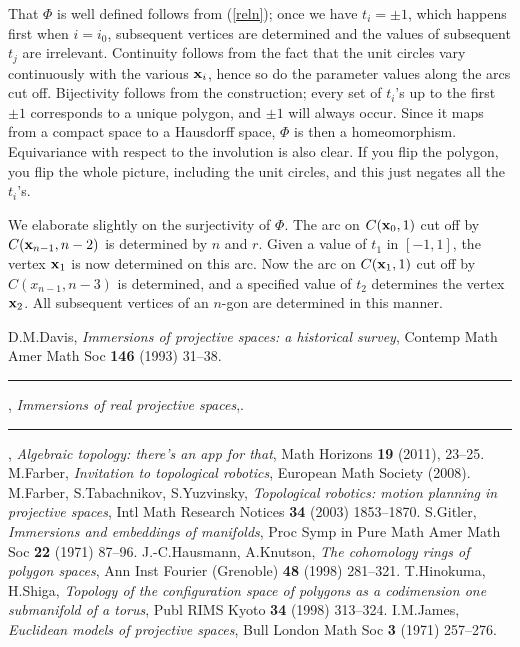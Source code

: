\documentclass[12pt]{amsart}
\numberwithin{equation}{section}
\begin{document}
That $\Phi$ is well defined  follows from (\ref{reln}); once we have $t_i=\pm1$, which happens first when $i=i_0$, subsequent vertices are determined and the values of subsequent
$t_j$ are irrelevant. Continuity follows from the fact that the unit circles vary continuously with the various ${{\bold x}}_i$, hence so do the parameter values along the arcs cut off.
Bijectivity  follows from the construction; every set of $t_i$'s up to the first $\pm1$ corresponds to a unique polygon, and $\pm1$ will always occur. Since it maps from a compact space to a Hausdorff space, $\Phi$ is then a homeomorphism. Equivariance with respect to the involution is also clear. If you flip the polygon, you flip the whole picture, including the unit circles,
and this just negates all the $t_i$'s.

We elaborate slightly on the surjectivity of $\Phi$. The arc on $C({{\bold x}}_0,1)$ cut off by $C({{\bold x}}_{n-1},n-2)$ is determined by $n$ and $r$. Given a value of $t_1$ in $[-1,1]$, the vertex ${{\bold x}}_1$ is now determined on this arc. Now the arc on $C({{\bold x}}_1,1)$ cut off by $C(x_{n-1},n-3)$ is determined, and a specified value of $t_2$ determines the vertex ${{\bold x}}_2$.
All subsequent vertices of an $n$-gon are determined in this manner.

 
\begin{thebibliography}{99}
 D.M.Davis, {\em Immersions of projective spaces: a historical survey}, Contemp Math Amer Math Soc {\bf 146} (1993) 31--38.
 {\rule{.6in}{.6pt}}, {\em Immersions of real projective spaces},.
 {\rule{.6in}{.6pt}}, {\em Algebraic topology: there's an app for that}, Math Horizons {\bf 19} (2011), 23--25.
 M.Farber, {\em Invitation to topological robotics}, European Math Society (2008).
 M.Farber, S.Tabachnikov, S.Yuzvinsky, {\em Topological robotics: motion planning in projective spaces}, Intl Math Research Notices {\bf 34} (2003) 1853--1870.
 S.Gitler, {\em Immersions and embeddings of manifolds}, Proc Symp in Pure Math Amer Math Soc {\bf 22} (1971) 87--96.
 J.-C.Hausmann, A.Knutson, {\em The cohomology rings of polygon spaces}, Ann Inst Fourier (Grenoble) {\bf 48} (1998) 281--321.
 T.Hinokuma, H.Shiga, {\em Topology of the configuration space of polygons as a codimension one submanifold of a torus}, Publ RIMS Kyoto {\bf 34} (1998) 313--324.
 I.M.James, {\em Euclidean models of projective spaces}, Bull London Math Soc {\bf 3} (1971) 257--276.

\end{thebibliography}
\end{document}
